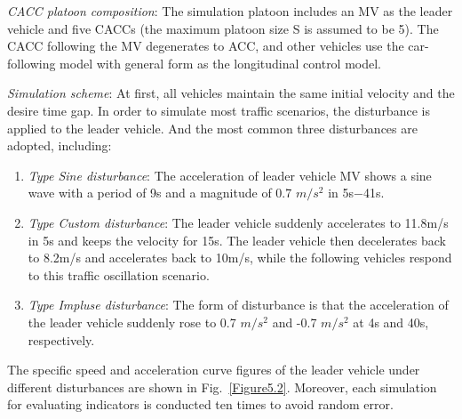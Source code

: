 \documentclass[journal]{IEEEtran}
\begin{document}
\textit{CACC platoon composition}: The simulation platoon includes an MV as the leader vehicle and five CACCs (the maximum platoon size S is assumed to be 5). The CACC following the MV degenerates to ACC, and other vehicles use the car-following model with general form as the longitudinal control model. 

\textit{Simulation scheme}: At first, all vehicles maintain the same initial velocity and the desire time gap. In order to simulate most traffic scenarios, the disturbance is applied to the leader vehicle. And the most common three disturbances are adopted, including:

\begin{enumerate}
\item \textit{Type \uppercase\expandafter{} Sine disturbance}: The acceleration of leader vehicle MV shows a sine wave with a period of 9s and a magnitude of 0.7 $m/s^2$ in 5s$-$41s.
\item \textit{Type \uppercase\expandafter{} Custom disturbance}: The leader vehicle suddenly accelerates to 11.8m/s in 5s and keeps the velocity for 15s. The leader vehicle then decelerates back to 8.2m/s and accelerates back to 10m/s, while the following vehicles respond to this traffic oscillation scenario.
\item \textit{Type \uppercase\expandafter{} Impluse disturbance}: The form of disturbance is that the acceleration of the leader vehicle suddenly rose to 0.7 $m/s^2$ and -0.7 $m/s^2$ at 4s and 40s, respectively.
\end{enumerate}

The specific speed and acceleration curve figures of the leader vehicle under different disturbances are shown in Fig.~\ref{Figure5.2}. Moreover, each simulation for evaluating indicators is conducted ten times to avoid random error.
\end{document}
